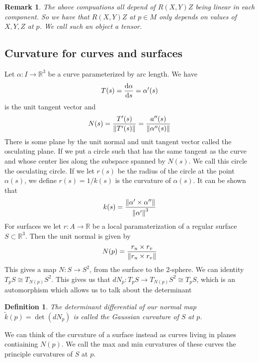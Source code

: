 \documentclass[a4paper]{article}
\newtheorem*{defn}{Definition}
\newtheorem*{rem}{Remark}
\begin{document}
\begin{rem}
  The above compuations all depend of $R(X,Y)Z$ being linear in each component. So we have that $R(X,Y)Z$ at $p \in M$ only depends on values of $X,Y,Z$ at $p$. We call such an object a tensor.
\end{rem}

\subsection*{Curvature for curves and surfaces}%
Let $\alpha: I \rightarrow \mathds{R}^3$ be a curve parameterized by arc length. We have
\[
  T(s) =  \dv{\alpha}{s} = \alpha'(s)
\]
is the unit tangent vector and
\[
  N(s) = \frac{T'(s)}{\norm{T'(s)}} = \frac{a''(s)}{\norm{\alpha''(s)}}
\]
There is some plane by the unit normal and unit tangent vector called the osculating plane. If we put a circle such that has the same tangent as the curve and whose center lies along the subspace spanned by $N(s)$. We call this circle the osculating circle. If we let $r(s)$ be the radius of the circle at the point $\alpha(s)$, we define $r(s) = 1/k(s)$ is the curvature of $\alpha(s)$. It can be shown that 
\[
  k(s) = \frac{\norm{\alpha' \times \alpha''}}{\norm{\alpha'}^3}
\]
For surfaces we let $r: A \rightarrow \mathds{R}$ be a local paramaterization of a regular surface $S \subset \mathds{R}^3$. Then the unit normal is given by 
\[
N(p) = \frac{r_u \times r_v}{\norm{r_u \times r_v}}
\]
This gives a map $N: S \rightarrow S^2$, from the surface to the 2-sphere. We can identity $T_pS \cong T_{N(p)}S^2$. This gives us that $dN_p: T_pS \rightarrow T_{N(p)}S^2 \cong T_pS$, which is an automorphism which allows us to talk about the determinant
\begin{defn}
  The determinant differential of our normal map $\tilde{k}(p) = \det (dN_p)$ is called the Gaussian curvature of $S$ at $p$.
\end{defn}
We can think of the curvature of a surface instead as curves living in planes contiaining $N(p)$. We call the max and min curvatures of these curves the principle curvatures of $S$ at $p$.
\end{document}
